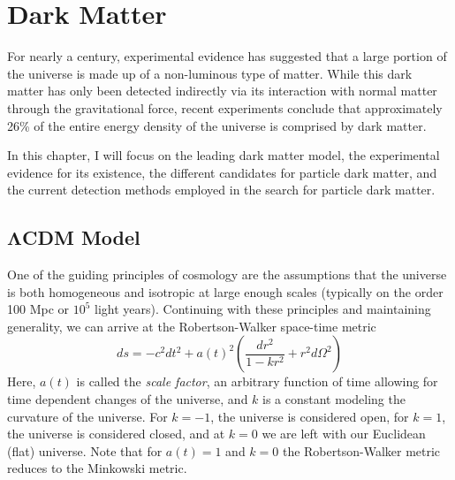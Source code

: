 

\pagestyle{cu}
\graphicspath{{./Chapter1/images/}}

\chapter[Dark Matter][Dark Matter]{Dark Matter}

For nearly a century, experimental evidence has suggested that a large portion of the universe is made up of a non-luminous type of matter.  While this dark matter has only been detected indirectly via its interaction with normal matter through the gravitational force, recent experiments conclude that approximately 26\% of the entire energy density of the universe is comprised by dark matter.

	In this chapter, I will focus on the leading dark matter model, the experimental evidence for its existence, the different candidates for particle dark matter, and the current detection methods employed in the search for particle dark matter.
	
	
\section[$\Lambda$CDM Model][$\Lambda$CDM Model]{$\boldsymbol{\Lambda}$CDM Model}
\label{sec:cdm}

	One of the guiding principles of cosmology are the assumptions that the universe is both homogeneous and isotropic at large enough scales (typically on the order 100 Mpc or $10^{5}$ light years).  Continuing with these principles and maintaining generality, we can arrive at the Robertson-Walker space-time metric
	\begin{equation}
		ds = -c^{2}dt^{2} + a(t)^{2}\left( \dfrac{dr^{2}}{1 - kr^{2}} + r^{2}d\Omega^{2}\right)
	\end{equation}
Here, $a(t)$ is called the \emph{scale factor}, an arbitrary function of time allowing for time dependent changes of the universe, and $k$ is a constant modeling the curvature of the universe.  For $k=-1$, the universe is considered open, for $k=1$, the universe is considered closed, and at $k=0$ we are left with our Euclidean (flat) universe.  Note that for $a(t) = 1$ and $k = 0$ the Robertson-Walker metric reduces to the Minkowski metric.

